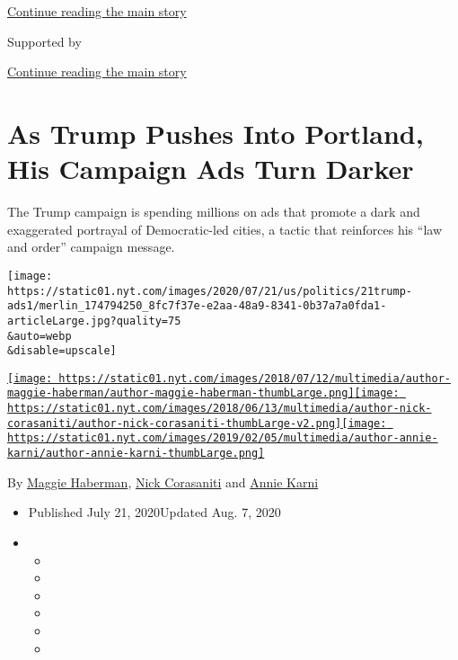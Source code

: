 \protect\hyperlink{after-top}{Continue reading the main story}

Supported by

\protect\hyperlink{after-sponsor}{Continue reading the main story}

\hypertarget{as-trump-pushes-into-portland-his-campaign-ads-turn-darker}{%
\section{As Trump Pushes Into Portland, His Campaign Ads Turn
Darker}\label{as-trump-pushes-into-portland-his-campaign-ads-turn-darker}}

The Trump campaign is spending millions on ads that promote a dark and
exaggerated portrayal of Democratic-led cities, a tactic that reinforces
his ``law and order'' campaign message.

\texttt{[image: https://static01.nyt.com/images/2020/07/21/us/politics/21trump-ads1/merlin\_174794250\_8fc7f37e-e2aa-48a9-8341-0b37a7a0fda1-articleLarge.jpg?quality=75\\\&auto=webp\\\&disable=upscale]}

\href{https://www.nytimes.com/by/maggie-haberman}{\texttt{[image: https://static01.nyt.com/images/2018/07/12/multimedia/author-maggie-haberman/author-maggie-haberman-thumbLarge.png]}}\href{https://www.nytimes.com/by/nick-corasaniti}{\texttt{[image: https://static01.nyt.com/images/2018/06/13/multimedia/author-nick-corasaniti/author-nick-corasaniti-thumbLarge-v2.png]}}\href{https://www.nytimes.com/by/annie-karni}{\texttt{[image: https://static01.nyt.com/images/2019/02/05/multimedia/author-annie-karni/author-annie-karni-thumbLarge.png]}}

By \href{https://www.nytimes.com/by/maggie-haberman}{Maggie Haberman},
\href{https://www.nytimes.com/by/nick-corasaniti}{Nick Corasaniti} and
\href{https://www.nytimes.com/by/annie-karni}{Annie Karni}

\begin{itemize}
\item
  Published July 21, 2020Updated Aug. 7, 2020
\item
  \begin{itemize}
  \item
  \item
  \item
  \item
  \item
  \item
  \end{itemize}
\end{itemize}

